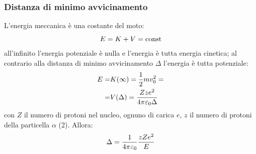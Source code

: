 \subsubsection{Distanza di minimo avvicinamento}
L'energia meccanica è una costante del moto:
\begin{equation}
	E=K+V=\text{const}
\end{equation}
all'infinito l'energia potenziale è nulla e l'energia è tutta energia cinetica; al contrario alla distanza di minimo avvicinamento $\Delta$ l'energia è tutta potenziale:
\begin{align}
	E=&K(\infty)=\frac{1}{2}mv_0^2=\\
	 =&V(\Delta)=\frac{Zze^2}{4\pi\varepsilon_0\Delta}
\end{align}
con $Z$ il numero di protoni nel nucleo, ognuno di carica $e$, $z$ il numero di protoni della particella $\alpha$ (2). Allora:
\begin{equation}
	\Delta=\frac{1}{4\pi\varepsilon_0}\frac{zZe^2}{E}
\end{equation}
